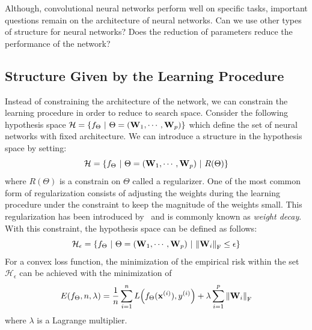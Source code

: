 Although, convolutional neural networks perform well on specific tasks, important questions remain on the architecture of neural networks. 
Can we use other types of structure for neural networks?  
Does the reduction of parameters reduce the performance of the network?


\subsection{Structure Given by the Learning Procedure}
\label{subsection:ch1-introducing_structured_into_the_learning_procedure}

Instead of constraining the architecture of the network, we can constrain the learning procedure in order to reduce to search space.
Consider the following hypothesis space $\mathcal{H} = \left\{ f_\Theta \ |\ \Theta = ( \Wmat_1, \cdots, \Wmat_p ) \right\}$ which define the set of neural networks with fixed architecture.
We can introduce a structure in the hypothesis space by setting:
\begin{equation}
  \mathcal{H} = \left\{ f_\Theta \ |\ \Theta = ( \Wmat_1, \cdots, \Wmat_p ) \ |\ R(\Theta) \right\} 
\end{equation}
where $R(\Theta)$ is a constrain on $\Theta$ called a regularizer.
One of the most common form of regularization consists of adjusting the weights during the learning procedure under the constraint to keep the magnitude of the weights small.
This regularization has been introduced by~\citet{tikhonov_arsenin_1977} and is commonly known as \emph{weight decay}.
With this constraint, the hypothesis space can be defined as follows:
\begin{equation}
  \mathcal{H_\epsilon} = \left\{ f_\Theta \ |\ \Theta = (\Wmat_1, \cdots, \Wmat_p) \ | \ \norm{\Wmat_i}_\mathrm{F} \leq \epsilon \right\} 
\end{equation}
For a convex loss function, the minimization of the empirical risk within the set $\mathcal{H}_\epsilon$ can be achieved with the minimization of
\begin{equation}
  E(f_\Theta, n, \lambda) = \frac{1}{n} \sum_{i = 1}^{n} L\left(f_\Theta(\xvec^{(i)}), y^{(i)} \right) + \lambda \sum_{i = 1}^{p} \norm{\Wmat_i}_\mathrm{F}
\end{equation}
where $\lambda$ is a Lagrange multiplier.

